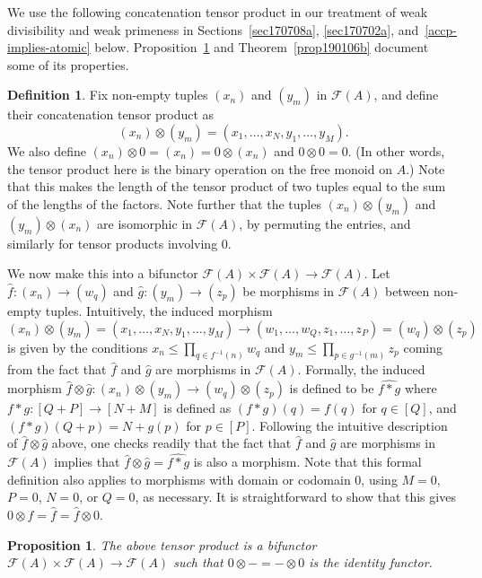 \documentclass[reqno]{amsart}
\theoremstyle{plain}
\newtheorem{prop}[lem]{Proposition}
\theoremstyle{definition}
\newtheorem{defn}[lem]{Definition}
\newcommand{\cat}[1]{\mathcal{#1}}
\newcommand{\catf}{\cat{F}}
\newcommand{\emptytuple}{\mathfrak{0}}
\renewcommand{\leq}{\leqslant}
\numberwithin{equation}{lem}
\begin{document}
We use the following 
concatenation tensor product in our  treatment of weak divisibility and 
weak primeness in Sections~\ref{sec170708a}, \ref{sec170702a}, and~\ref{accp-implies-atomic}
below. 
Proposition~\ref{prop170626a} and Theorem~\ref{prop190106b} document some of its properties.

\begin{defn}\label{defn170605a}
Fix non-empty tuples $(x_n)$ and $(y_m)$ in $\catf(A)$, and define  
their concatenation tensor product
as
$$(x_n)\otimes(y_m)=(x_1,\ldots,x_N,y_1,\ldots,y_M).$$
We also define $(x_n)\otimes\emptytuple=(x_n)=\emptytuple\otimes(x_n)$ and
$\emptytuple\otimes\emptytuple=\emptytuple$.
(In other words, the tensor product here is the binary operation on the free monoid on $A$.)
Note that this makes the length of the tensor product of two tuples equal to the sum of the lengths of the factors.
Note further that the tuples $(x_n)\otimes(y_m)$ and $(y_m)\otimes(x_n)$ are isomorphic in $\catf(A)$,
by permuting the entries, and similarly for tensor products involving $\emptytuple$.

We now make 
this into a bifunctor $\catf(A)\times\catf(A)\to\catf(A)$.
Let $\hat f\colon (x_n)\to (w_q)$ and $\hat g\colon (y_m)\to (z_p)$ be morphisms in $\catf(A)$ between non-empty tuples.
Intuitively, the induced morphism 
$$(x_n)\otimes(y_m)=(x_1,\ldots,x_N,y_1,\ldots,y_M)\to(w_1,\ldots,w_Q,z_1,\ldots,z_P)=(w_q)\otimes(z_p)$$
is given by the  
conditions  $x_n\leq\prod_{q\in f^{-1}(n)}w_q$ and 
$y_m\leq\prod_{p\in g^{-1}(m)}z_p$ coming from the fact that $\hat f$ and $\hat g$ are morphisms in $\catf(A)$.
Formally, the induced morphism $\hat f\otimes\hat g\colon(x_n)\otimes(y_m)\to (w_q)\otimes(z_p)$ is defined to be
$\widehat{f*g}$ where $f*g\colon[Q+P]\to[N+M]$ is defined as
$(f*g)(q)=f(q)$ for $q\in [Q]$, and $(f*g)(Q+p)=N+g(p)$ for $p\in[P]$.
Following the intuitive description of $\hat f\otimes\hat g$ above, one checks readily that the fact that $\hat f$ and $\hat g$ are morphisms in $\catf(A)$
implies that $\hat f\otimes\hat g=\widehat{f*g}$ is also a morphism.
Note that this formal definition also applies to morphisms with domain or codomain $\emptytuple$, using $M=0$, $P=0$, $N=0$, or $Q=0$,
as necessary.
It is straightforward to show that this gives $\emptytuple\otimes\hat f=\hat f=\hat f\otimes \emptytuple$.
\end{defn}

\begin{prop}\label{prop170626a}
The above tensor product is a bifunctor $\catf(A)\times\catf(A)\to\catf(A)$ such that
$\emptytuple\otimes-=-\otimes\emptytuple$ is the identity functor.  
\end{prop}
\end{document}
